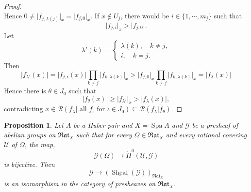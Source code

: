 \documentclass[8pt]{article}
\numberwithin{equation}{section}
\newtheorem{proposition}{Proposition}[subsection]
\DeclareMathOperator{\Spa}{Spa}
\DeclareMathOperator{\Sheaf}{Sheaf}
\newcommand{\cR}[0]{\mathcal{R}}
\newcommand{\ab}[1]{\vert #1 \vert}
\newcommand{\Rat}[0]{\mathfrak{Rat}}
\begin{document}
\begin{proof}
\begin{equation*}
    \end{equation*}
    Hence $0\not=\ab{f_{j,\lambda(j)}}_x = \ab{f_{j,0}}_x$.
    If $x\not\in U_j$, there would be $i\in \{1,\cdots,m_j\}$ such that 
    \begin{equation*}
        \ab{f_{j,i}}_x>\ab{f_{j,0}}.
    \end{equation*}
    Let 
    \begin{equation*}
        \lambda'(k) = \begin{cases}
            \lambda(k),\quad k\not=j,\\
            i,\quad k=j.
        \end{cases}
    \end{equation*}
    Then 
    \begin{equation*}
        \ab{f_{\lambda'}(x)} = \ab{f_{j,i}(x)}\prod_{k\not=j}\ab{f_{k,\lambda(k)}}_x>\ab{f_{j,0}}_x\prod_{k\not=j}\ab{f_{k,\lambda(k)}}_x = \ab{f_\lambda(x)}
    \end{equation*}
    Hence there is $\theta\in J_0$ such that 
    \begin{equation*}
    \ab{f_\theta(x)}\geq \ab{f_{\lambda'}}_x>\ab{f_\lambda(x)},
    \end{equation*}
    contradicting $x\in\cR(f_\lambda|\text{ all $f_\iota$ for $\iota\in J_0$})\subseteq\cR(f_\lambda|f_\theta)$.
\end{proof}


\begin{proposition}
    \label{proposition_24_3}
    Let $A$ be a Huber pair and $X=\Spa A$ and $\mathcal{G}$ be a presheaf of abelian groups on $\Rat_X$ such that for every $\Omega\in\Rat_X$ and every rational covering $\mathcal{U}$ of $\Omega$, the map,
    \begin{equation*}
        \mathcal{G}(\Omega)\to \check{H}^0(\mathcal{U},\mathcal{G})
    \end{equation*}
    is bijective. Then 
    \begin{equation*}
        \mathcal{G}\to(\underline{\Sheaf}(\mathcal{G}))_{\Rat_X}
    \end{equation*}
    is an isomorphism in the category of presheaves on $\Rat_X$.
\end{proposition}
\end{document}
